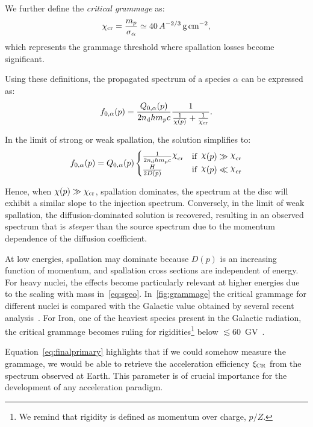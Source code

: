We further define the \emph{critical grammage} as:  
\begin{equation}
\chi_{\rm cr} = \frac{m_p}{\sigma_\alpha} \simeq 40 \, A^{-2/3} \, \text{g} \, \text{cm}^{-2},
\end{equation}
which represents the grammage threshold where spallation losses become significant.  

Using these definitions, the propagated spectrum of a species \(\alpha\) can be expressed as:  
\begin{equation}\label{eq:finalprimary}
f_{0,\alpha}(p) = \frac{Q_{0,\alpha}(p)}{2 n_{\rm d} h m_p c} \frac{1}{\frac{1}{\chi(p)} + \frac{1}{\chi_{\rm cr}}}.
\end{equation}

In the limit of strong or weak spallation, the solution simplifies to:  
\begin{equation}
f_{0,\alpha}(p) = Q_{0,\alpha}(p)
\begin{cases}
\frac{1}{2n_{\rm d}hm_{\rm p}c}\rchi_{\rm cr} & \text{if } \, \rchi(p) \gg \rchi_{\rm cr} \\
\frac{H}{2D(p)} & \text{if } \, \rchi(p) \ll \rchi_{\rm cr}
\end{cases}
\end{equation}

Hence, when $\chi(p)\gg \chi_{\rm cr}$, spallation dominates, the spectrum at the disc will exhibit a similar slope to the injection spectrum. Conversely, in the limit of weak spallation, the diffusion-dominated solution is recovered, resulting in an observed spectrum that is \emph{steeper} than the source spectrum due to the momentum dependence of the diffusion coefficient.

At low energies, spallation may dominate because $D(p)$ is an increasing function of momentum, and spallation cross sections are independent of energy. For heavy nuclei, the effects become particularly relevant at higher energies due to the scaling with mass in~\ref{eq:sgeo}.
%
In~\ref{fig:grammage} the critical grammage for different nuclei is compared with the Galactic value obtained by several recent analysis~\cite{Evoli2019prd,Weinrich2020aa}. For Iron, one of the heaviest species present in the Galactic radiation, the critical grammage becomes ruling for rigidities\footnote{We remind that rigidity is defined as momentum over charge, $p/Z$.} below $\lesssim 60$~GV~\cite{Schroer2021prd}.

Equation~\eqref{eq:finalprimary} highlights that if we could somehow measure the grammage, we would be able to retrieve the acceleration efficiency $\xi_{\rm CR}$ from the spectrum observed at Earth. This parameter is of crucial importance for the development of any acceleration paradigm.

